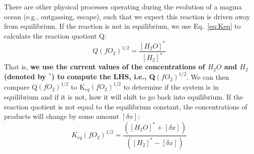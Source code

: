 There are other physical processes operating during the evolution of a magma ocean (e.g., outgassing, escape), such that we expect this reaction is driven away from equilibrium.  If the reaction is not in equilibrium, we use Eq.~\ref{eq:Keq} to calculate the reaction quotient Q:
\begin{equation}
Q\left(fO_2\right)^{1/2} = \frac{[H_2O]^\ast}{[H_2]^\ast }
\end{equation}
That is, \textbf{we use the current values of the concentrations of $H_2O$ and $H_2$ (denoted by $^\ast$) to compute the LHS, i.e., Q$(fO_2)^{1/2}$}.
We can then compare Q$(fO_2)^{1/2}$ to K$_{eq}(fO_2)^{1/2}$ to determine if the system is in equilibrium and if it is not, how it will shift to go back into equilibrium. If the reaction quotient is not equal to the equilibrium constant, the concentrations of products will change by some amount $[\delta x]$:
\begin{equation}
K_{eq} (fO_2)^{1/2} = \frac{([H_2O]^\ast + [\delta x])}{([H_2]^\ast - [\delta x])}
\label{eq:Keq_diff}
\end{equation}
